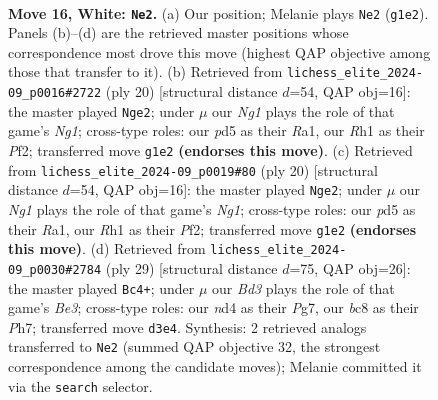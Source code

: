 \documentclass[11pt]{article}
\begin{document}
\clearpage

\begin{figure}[p]\centering
\begin{subfigure}{0.46\textwidth}\centering
\resizebox{\linewidth}{!}{%
\newchessgame
\chessboard[
  setfen={rnb1k2r/pp2bppp/4p3/3pP3/3n1P2/3B2P1/P2N3P/R1B1K1NR w KQ - 1 16},
  showmover=false,
  pgfstyle=straightmove, color=movearrow, markmove={g1-e2}
]}
\caption{}
\end{subfigure}\hfill
\begin{subfigure}{0.46\textwidth}\centering
\resizebox{\linewidth}{!}{%
\newchessgame
\chessboard[
  setfen={rn2kb1r/1p3p1p/2p1bp2/p2p4/3P4/2NBP3/PP3PPP/R3K1NR w KQkq - 0 11},
  showmover=false,
  pgfstyle=straightmove, color=movearrow, markmove={g1-e2}
]}
\caption{}
\end{subfigure}
\\[4pt]
\begin{subfigure}{0.46\textwidth}\centering
\resizebox{\linewidth}{!}{%
\newchessgame
\chessboard[
  setfen={rn2kb1r/1p3p1p/2p1bp2/p2p4/3P4/2NBP3/PP3PPP/R3K1NR w KQkq - 0 11},
  showmover=false,
  pgfstyle=straightmove, color=movearrow, markmove={g1-e2}
]}
\caption{}
\end{subfigure}\hfill
\begin{subfigure}{0.46\textwidth}\centering
\resizebox{\linewidth}{!}{%
\newchessgame
\chessboard[
  setfen={r3k2r/2p3pp/p1n1bp2/2b5/p3P3/2P2N2/PPN1KPPP/R1B4R b kq - 5 15},
  showmover=false,
  pgfstyle=straightmove, color=movearrow, markmove={e6-c4}
]}
\caption{}
\end{subfigure}
\caption{\textbf{Move 16, White: \texttt{Ne2}.} (a) Our position; Melanie plays \texttt{Ne2} (\texttt{g1e2}). Panels (b)--(d) are the retrieved master positions whose correspondence most drove this move (highest QAP objective among those that transfer to it). (b) Retrieved from \texttt{lichess\_elite\_2024-09\_p0016\#2722} (ply 20) [structural distance $d$=54, QAP obj=16]: the master played \texttt{Nge2}; under $\mu$ our \emph{Ng1} plays the role of that game's \emph{Ng1}; cross-type roles: our \emph{p}d5 as their \emph{R}a1, our \emph{R}h1 as their \emph{P}f2; transferred move \texttt{g1e2} \textbf{(endorses this move)}. (c) Retrieved from \texttt{lichess\_elite\_2024-09\_p0019\#80} (ply 20) [structural distance $d$=54, QAP obj=16]: the master played \texttt{Nge2}; under $\mu$ our \emph{Ng1} plays the role of that game's \emph{Ng1}; cross-type roles: our \emph{p}d5 as their \emph{R}a1, our \emph{R}h1 as their \emph{P}f2; transferred move \texttt{g1e2} \textbf{(endorses this move)}. (d) Retrieved from \texttt{lichess\_elite\_2024-09\_p0030\#2784} (ply 29) [structural distance $d$=75, QAP obj=26]: the master played \texttt{Bc4+}; under $\mu$ our \emph{Bd3} plays the role of that game's \emph{Be3}; cross-type roles: our \emph{n}d4 as their \emph{P}g7, our \emph{b}c8 as their \emph{P}h7; transferred move \texttt{d3e4}. Synthesis: 2 retrieved analogs transferred to \texttt{Ne2} (summed QAP objective 32, the strongest correspondence among the candidate moves); Melanie committed it via the \texttt{search} selector.}
\label{fig:thought-m30}
\end{figure}
\end{document}
